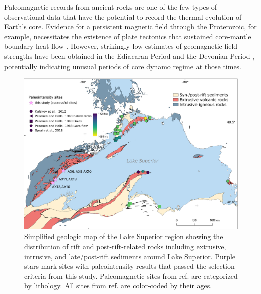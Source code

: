 \documentclass[9pt,twocolumn,twoside,lineno]{pnas-new}
\begin{document}
Paleomagnetic records from ancient rocks are one of the few types of observational data that have the potential to record the thermal evolution of Earth’s core. Evidence for a persistent magnetic field through the Proterozoic, for example, necessitates the existence of plate tectonics that sustained core-mantle boundary heat flow \cite{Swanson-Hysell2021c}. However, strikingly low estimates of geomagnetic field strengths have been obtained in the Ediacaran Period \cite{Bono2019a, Shcherbakova2019a,Thallner2021b} and the Devonian Period \cite{Shcherbakova2017a, Shcherbakova2021a}, potentially indicating unusual periods of core dynamo regime at those times. 


\begin{figure}
\centering
\noindent\includegraphics[width=11.4 cm]{Geologic_map.pdf}
\caption{\footnotesize{Simplified geologic map of the Lake Superior region showing the distribution of rift and post-rift-related rocks including extrusive, intrusive, and late/post-rift sediments around Lake Superior. Purple stars mark sites with paleointensity results that passed the selection criteria from this study. Paleomagnetic sites from ref. \citealp{Pesonen1983a} are categorized by lithology. All sites from ref. \citealp{Pesonen1983a, Kulakov2013a, Sprain2018a} are color-coded by their ages.}}
\label{fig:Geologic_map}
\end{figure}
\end{document}
